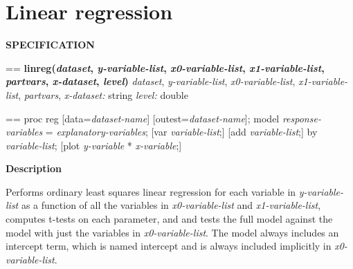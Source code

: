 \documentclass{book}
\makeatletter
\newcommand\Texinfocommandstyletextvar[1]{{\normalfont{}\textsl{#1}}}%
\newenvironment{Texinfopreformatted}{%
  \par\GNUTobeylines\obeyspaces\frenchspacing\parskip=\z@\parindent=\z@}{}
{\catcode`\^^M=13 \gdef\GNUTobeylines{\catcode`\^^M=13 \def^^M{\null\par}}}
\newenvironment{Texinfoindented}{\begin{list}{}{}\item\relax}{\end{list}}
\renewcommand{\_}{\Texinfounderscore\discretionary{}{}{}}
\makeatother
\begin{document}
\section{{Linear regression}}
\label{anchor:Linear-regression}%

\noindent{}\textbf{SPECIFICATION}
\begin{Texinfoindented}
\begin{Texinfopreformatted}%
\textbf{linreg(\Texinfocommandstyletextvar{dataset}, \Texinfocommandstyletextvar{y-variable-list}, \Texinfocommandstyletextvar{x0-variable-list}, \Texinfocommandstyletextvar{x1-variable-list}, \Texinfocommandstyletextvar{partvars}, \Texinfocommandstyletextvar{x-dataset}, \Texinfocommandstyletextvar{level})}
\Texinfocommandstyletextvar{dataset}, \Texinfocommandstyletextvar{y-variable-list}, \Texinfocommandstyletextvar{x0-variable-list}, \Texinfocommandstyletextvar{x1-variable-list}, \Texinfocommandstyletextvar{partvars}, \Texinfocommandstyletextvar{x-dataset:} string
\Texinfocommandstyletextvar{level:} double
\end{Texinfopreformatted}
\end{Texinfoindented}

\begin{Texinfoindented}
\begin{Texinfopreformatted}%
proc reg [data=\Texinfocommandstyletextvar{dataset-name}] [outest=\Texinfocommandstyletextvar{dataset-name}];
model \Texinfocommandstyletextvar{response-variables} = \Texinfocommandstyletextvar{explanatory-variables};
[var \Texinfocommandstyletextvar{variable-list};]
[add \Texinfocommandstyletextvar{variable-list};]
by \Texinfocommandstyletextvar{variable-list};
[plot \Texinfocommandstyletextvar{y-variable} * \Texinfocommandstyletextvar{x-variable};]

\end{Texinfopreformatted}
\end{Texinfoindented}

%

\noindent{}\textbf{Description}

Performs ordinary least squares linear regression for each variable in
\Texinfocommandstyletextvar{y-variable-list} as a function of all the variables in \Texinfocommandstyletextvar{x0-variable-list}
and \Texinfocommandstyletextvar{x1-variable-list}, computes t-tests on each parameter, and
and tests the full model against the model with just the variables in
\Texinfocommandstyletextvar{x0-variable-list}.
The model always includes an intercept term, which is named \_intercept\_
and is always included implicitly in \Texinfocommandstyletextvar{x0-variable-list}.
\end{document}

